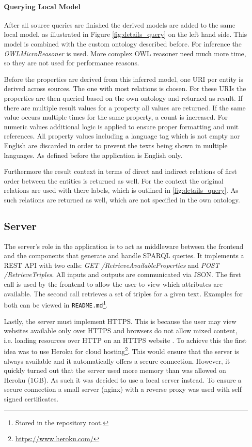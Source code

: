\paragraph{Querying Local Model}
After all source queries are finished the derived models are added to the same local model, as illustrated in Figure \ref{fig:details_query} on the left hand side. This model is combined with the custom ontology described before. For inference the \textit{OWLMicroReasoner} is used. More complex OWL reasoner need much more time, so they are not used for performance reasons. 

Before the properties are derived from this inferred model, one URI per entity is derived across sources. The one with most relations is chosen. 
For these URIs the properties are then queried based on the own ontology and returned as result. If there are multiple result values for a property all values are returned. If the same value occurs multiple times for the same property, a count is increased. For numeric values additional logic is applied to ensure proper formatting and unit references. All property values including a language tag which is not empty nor English are discarded in order to prevent the texts being shown in multiple languages. As defined before the application is English only. 

Furthermore the result context in terms of direct and indirect relations of first order between the entities is returned as well. For the context the original relations are used with there labels, which is outlined in \ref{fig:details_query}. As such relations are returned as well, which are not specified in the own ontology. 

\subsection{Server} 
\label{sec:server}
The server's role in the application is to act as middleware between the frontend and the components that generate and handle SPARQL queries. It implements a REST API with two calls: \textit{GET /RetrieveAvailableProperties} and \textit{POST /RetrieveTriples}. All inputs and outputs are communicated via JSON. The first call is used by the frontend to allow the user to view which attributes are available. The second call retrieves a set of triples for a given text. Examples for both can be viewed in \texttt{README.md}\footnote{Stored in the repository root.}. 

Lastly, the server must implement HTTPS. This is because the user may view websites available only over HTTPS and browsers do not allow mixed content, i.e. loading resources over HTTP on an HTTPS website \cite{ChromeMixedContent}. To achieve this the first idea was to use Heroku for cloud hosting\footnote{\url{https://www.heroku.com/}}. This would ensure that the server is always available and it automatically offers a secure connection. However, it quickly turned out that the server used more memory than was allowed on Heroku (1GB). As such it was decided to use a local server instead. To ensure a secure connection a small server (nginx) with a reverse proxy was used with self signed certificates\cite{nginxReverseProxy}. 




